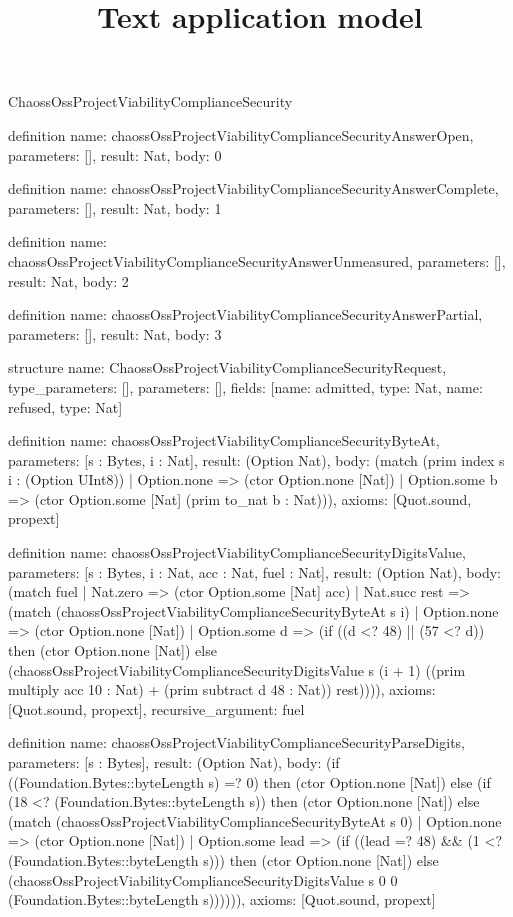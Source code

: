 \begin{lexlean}{ChaossOssProjectViabilityComplianceSecurity}
\title{Text application model}
\begin{semanticmodule}
definition{
  name: chaossOssProjectViabilityComplianceSecurityAnswerOpen,
  parameters: [],
  result: Nat,
  body: 0
}

definition{
  name: chaossOssProjectViabilityComplianceSecurityAnswerComplete,
  parameters: [],
  result: Nat,
  body: 1
}

definition{
  name: chaossOssProjectViabilityComplianceSecurityAnswerUnmeasured,
  parameters: [],
  result: Nat,
  body: 2
}

definition{
  name: chaossOssProjectViabilityComplianceSecurityAnswerPartial,
  parameters: [],
  result: Nat,
  body: 3
}

structure{
  name: ChaossOssProjectViabilityComplianceSecurityRequest,
  type_parameters: [],
  parameters: [],
  fields: [{name: admitted, type: Nat}, {name: refused, type: Nat}]
}

definition{
  name: chaossOssProjectViabilityComplianceSecurityByteAt,
  parameters: [s : Bytes, i : Nat],
  result: (Option Nat),
  body: (match (prim index s i : (Option UInt8))
    | Option.none => (ctor Option.none [Nat])
    | Option.some b => (ctor Option.some [Nat] (prim to_nat b : Nat))),
  axioms: [Quot.sound, propext]
}

definition{
  name: chaossOssProjectViabilityComplianceSecurityDigitsValue,
  parameters: [s : Bytes, i : Nat, acc : Nat, fuel : Nat],
  result: (Option Nat),
  body: (match fuel
    | Nat.zero => (ctor Option.some [Nat] acc)
    | Nat.succ rest => (match (chaossOssProjectViabilityComplianceSecurityByteAt s i)
      | Option.none => (ctor Option.none [Nat])
      | Option.some d => (if ((d <? 48) || (57 <? d)) then (ctor Option.none [Nat]) else (chaossOssProjectViabilityComplianceSecurityDigitsValue s (i + 1) ((prim multiply acc 10 : Nat) + (prim subtract d 48 : Nat)) rest)))),
  axioms: [Quot.sound, propext],
  recursive_argument: fuel
}

definition{
  name: chaossOssProjectViabilityComplianceSecurityParseDigits,
  parameters: [s : Bytes],
  result: (Option Nat),
  body: (if ((Foundation.Bytes::byteLength s) =? 0) then (ctor Option.none [Nat]) else (if (18 <? (Foundation.Bytes::byteLength s)) then (ctor Option.none [Nat]) else (match (chaossOssProjectViabilityComplianceSecurityByteAt s 0)
    | Option.none => (ctor Option.none [Nat])
    | Option.some lead => (if ((lead =? 48) && (1 <? (Foundation.Bytes::byteLength s))) then (ctor Option.none [Nat]) else (chaossOssProjectViabilityComplianceSecurityDigitsValue s 0 0 (Foundation.Bytes::byteLength s)))))),
  axioms: [Quot.sound, propext]
}


\end{semanticmodule}
\end{lexlean}
